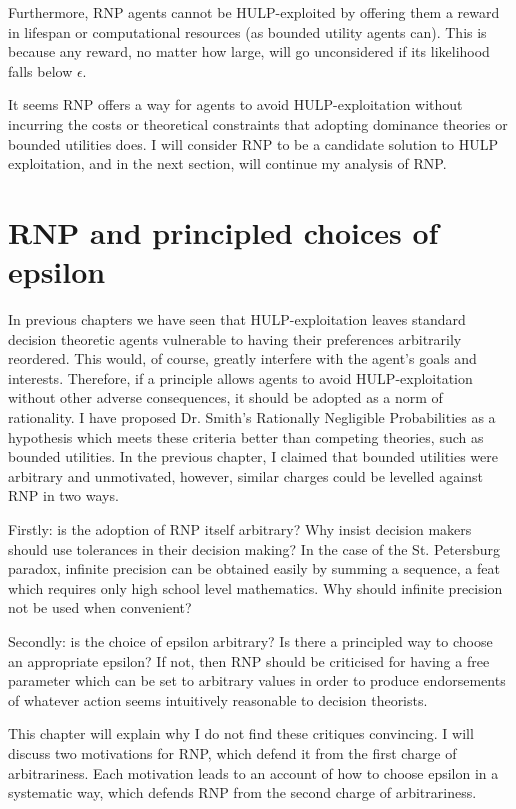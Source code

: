 \documentclass{article}
\begin{document}
Furthermore, RNP agents cannot be HULP-exploited by offering them a reward in lifespan or computational resources (as bounded utility agents can). This is because any reward, no matter how large, will go unconsidered if its likelihood falls below \(\epsilon\).

It seems RNP offers a way for agents to avoid HULP-exploitation without incurring the costs or theoretical constraints that adopting dominance theories or bounded utilities does. I will consider RNP to be a candidate solution to HULP exploitation, and in the next section, will continue my analysis of RNP.

\section{RNP and principled choices of epsilon}

In previous chapters we have seen that HULP-exploitation leaves standard decision theoretic agents vulnerable to having their preferences arbitrarily reordered. This would, of course, greatly interfere with the agent's goals and interests. Therefore, if a principle allows agents to avoid HULP-exploitation without other adverse consequences, it should be adopted as a norm of rationality. I have proposed Dr. Smith's Rationally Negligible Probabilities as a hypothesis which meets these criteria better than competing theories, such as bounded utilities. In the previous chapter, I claimed that bounded utilities were arbitrary and unmotivated, however, similar charges could be levelled against RNP in two ways.

Firstly: is the adoption of RNP itself arbitrary? Why insist decision makers should use tolerances in their decision making? In the case of the St. Petersburg paradox, infinite precision can be obtained easily by summing a sequence, a feat which requires only high school level mathematics. Why should infinite precision not be used when convenient?

Secondly: is the choice of epsilon arbitrary? Is there a principled way to choose an appropriate epsilon? If not, then RNP should be criticised for having a free parameter which can be set to arbitrary values in order to produce endorsements of whatever action seems intuitively reasonable to decision theorists. 

This chapter will explain why I do not find these critiques convincing. I will discuss two motivations for RNP, which defend it from the first charge of arbitrariness. Each motivation leads to an account of how to choose epsilon in a systematic way, which defends RNP from the second charge of arbitrariness. 
\end{document}
